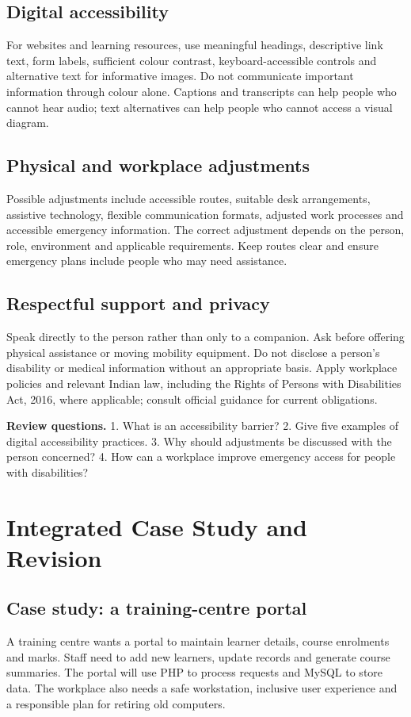 \documentclass[11pt,openany,oneside]{book}
\newcommand{\exampractice}[1]{\begin{tcolorbox}[colback=LightGold,colframe=Gold,boxrule=.6pt,arc=1.2mm,left=2mm,right=2mm,top=1mm,bottom=1mm]\textbf{Review questions.} #1\end{tcolorbox}}
\begin{document}
\section{Digital accessibility}
For websites and learning resources, use meaningful headings, descriptive link text, form labels, sufficient colour contrast, keyboard-accessible controls and alternative text for informative images. Do not communicate important information through colour alone. Captions and transcripts can help people who cannot hear audio; text alternatives can help people who cannot access a visual diagram.

\section{Physical and workplace adjustments}
Possible adjustments include accessible routes, suitable desk arrangements, assistive technology, flexible communication formats, adjusted work processes and accessible emergency information. The correct adjustment depends on the person, role, environment and applicable requirements. Keep routes clear and ensure emergency plans include people who may need assistance.

\section{Respectful support and privacy}
Speak directly to the person rather than only to a companion. Ask before offering physical assistance or moving mobility equipment. Do not disclose a person's disability or medical information without an appropriate basis. Apply workplace policies and relevant Indian law, including the Rights of Persons with Disabilities Act, 2016, where applicable; consult official guidance for current obligations.

\exampractice{1. What is an accessibility barrier? 2. Give five examples of digital accessibility practices. 3. Why should adjustments be discussed with the person concerned? 4. How can a workplace improve emergency access for people with disabilities?}

\chapter{Integrated Case Study and Revision}
\section{Case study: a training-centre portal}
A training centre wants a portal to maintain learner details, course enrolments and marks. Staff need to add new learners, update records and generate course summaries. The portal will use PHP to process requests and MySQL to store data. The workplace also needs a safe workstation, inclusive user experience and a responsible plan for retiring old computers.
\end{document}
